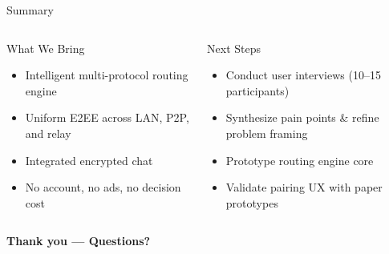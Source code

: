 \documentclass[xcolor=table,dvipsnames,svgnames,aspectratio=169]{beamer}
\begin{document}
\begin{frame}{Summary}
  \begin{columns}[c]
    \begin{block}{What We Bring}
      \begin{itemize}
        \item Intelligent multi-protocol routing engine
        \item Uniform E2EE across LAN, P2P, and relay
        \item Integrated encrypted chat
        \item No account, no ads, no decision cost
      \end{itemize}
    \end{block}
    \begin{block}{Next Steps}
      \begin{itemize}
        \item Conduct user interviews (10--15 participants)
        \item Synthesize pain points \& refine problem framing
        \item Prototype routing engine core
        \item Validate pairing UX with paper prototypes
      \end{itemize}
    \end{block}
  \end{columns}

  \vspace{1.5em}

  \centering\Large\textbf{Thank you --- Questions?}
\end{frame}

\makebottom
\end{document}

